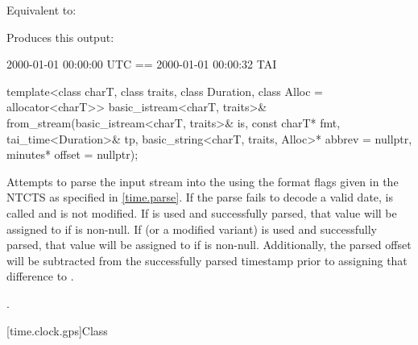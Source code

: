 \begin{itemdescr}
\pnum
\effects
Equivalent to:

\pnum
\begin{example}

Produces this output:

\begin{outputblock}
2000-01-01 00:00:00 UTC == 2000-01-01 00:00:32 TAI
\end{outputblock}
\end{example}
\end{itemdescr}

%
\begin{itemdecl}
template<class charT, class traits, class Duration, class Alloc = allocator<charT>>
  basic_istream<charT, traits>&
    from_stream(basic_istream<charT, traits>& is, const charT* fmt,
                tai_time<Duration>& tp, basic_string<charT, traits, Alloc>* abbrev = nullptr,
                minutes* offset = nullptr);
\end{itemdecl}

\begin{itemdescr}
\pnum
\effects
Attempts to parse the input stream 
into the   using
the format flags given in the NTCTS 
as specified in \ref{time.parse}.
If the parse fails to decode a valid date,
 is called and
 is not modified.
If  is used and successfully parsed,
that value will be assigned to  if  is non-null.
If  (or a modified variant) is used and successfully parsed,
that value will be assigned to  if  is non-null.
Additionally, the parsed offset will be subtracted from
the successfully parsed timestamp prior to assigning that difference to .

\pnum
\returns
{}.
\end{itemdescr}

[time.clock.gps]{Class }


